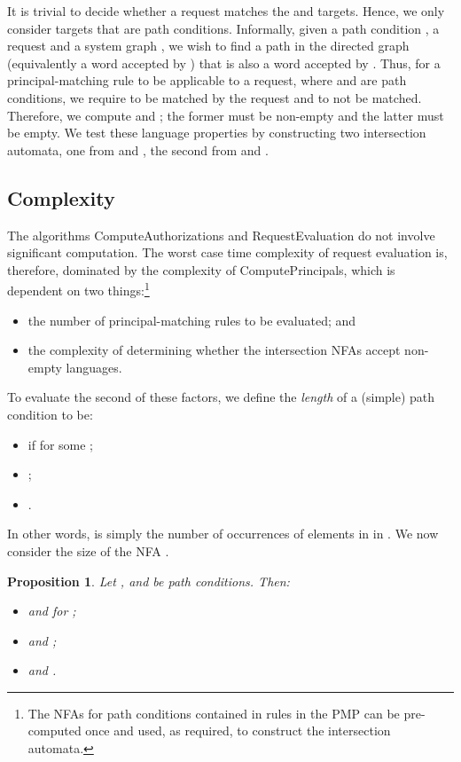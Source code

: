 \documentclass{article}
\newtheorem{proposition}{Proposition}
\begin{document}
It is trivial to decide whether a request matches the  and  targets.
Hence, we only consider targets that are path conditions.
Informally, given a path condition , a request  and a system graph , we wish to find a path in the directed graph  (equivalently a word accepted by ) that is also a word accepted by .
Thus, for a principal-matching rule  to be applicable to a request, where  and  are path conditions, we require  to be matched by the request and  to not be matched.
Therefore, we compute  and ; the former must be non-empty  and the latter must be empty.
We test these language properties by constructing two intersection automata, one from  and , the second from  and .

\subsection{Complexity}\label{sec:requests:correctness_and_complexity}

The algorithms \textsf{ComputeAuthorizations} and \textsf{RequestEvaluation} do not involve significant computation.
The worst case time complexity of request evaluation is, therefore, dominated by the complexity of \textsf{ComputePrincipals}, which is dependent on two things:\footnote{The NFAs for path conditions contained in rules in the PMP can be pre-computed once and used, as required, to construct the intersection automata.}
\begin{itemize}
    \item the number of principal-matching rules to be evaluated; and
    \item the complexity of determining whether the intersection NFAs accept non-empty languages.
\end{itemize}
To evaluate the second of these factors, we define the \emph{length}  of a (simple) path condition  to be:
    \begin{itemize}
        \item   if  for some ; \item  ;
        \item  .
    \end{itemize}
In other words,  is simply the number of occurrences of elements in  in .
We now consider the size of the NFA .

\begin{proposition}
Let ,  and  be path conditions.  Then:
 \begin{itemize}
  \item  and  for ;
  \item  and ;
  \item  and .
 \end{itemize}
\end{proposition}
\end{document}
